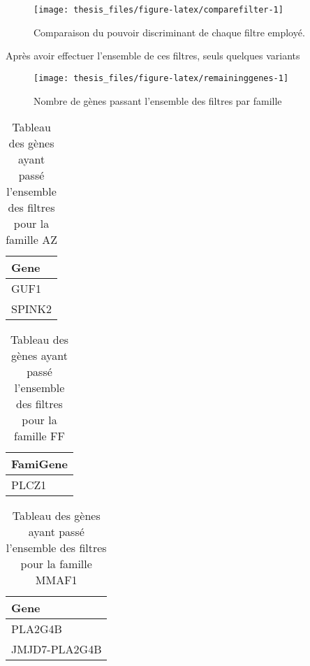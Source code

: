\documentclass[12pt,twoside]{reedthesis}
\theoremstyle{definition}
\theoremstyle{definition}
\theoremstyle{remark}
\begin{document}
  \begin{figure}
  
  {\centering \texttt{[image: thesis\_files/figure-latex/comparefilter-1]} 
  
  }
  
  \caption[Comparaison du pouvoir discriminant de chaque filtre employé.]{Comparaison du pouvoir discriminant de chaque filtre employé.}\label{fig:comparefilter}
  \end{figure}
  
  Après avoir effectuer l'ensemble de ces filtres, seuls quelques variants
  
  \begin{figure}
  
  {\centering \texttt{[image: thesis\_files/figure-latex/remaininggenes-1]} 
  
  }
  
  \caption[Nombre de gènes passant l'ensemble des filtres par famille]{Nombre de gènes passant l'ensemble des filtres par famille}\label{fig:remaininggenes}
  \end{figure}
  
  \begin{table}
  
  \caption{\label{tab:tablegeneaz}Tableau des gènes ayant passé l'ensemble des filtres pour la famille AZ}
  \centering
  \begin{tabular}[t]{l}
  \hline
  Gene\\
  \hline
  GUF1\\
  \hline
  SPINK2\\
  \hline
  \end{tabular}
  \end{table}
  
  \begin{table}
  
  \caption{\label{tab:tablegeneff}Tableau des gènes ayant passé l'ensemble des filtres pour la famille FF}
  \centering
  \begin{tabular}[t]{l}
  \hline
  FamiGene\\
  \hline
  PLCZ1\\
  \hline
  \end{tabular}
  \end{table}
  
  \begin{table}
  
  \caption{\label{tab:tablegenemmaf1}Tableau des gènes ayant passé l'ensemble des filtres pour la famille MMAF1}
  \centering
  \begin{tabular}[t]{l}
  \hline
  Gene\\
  \hline
  PLA2G4B\\
  \hline
  JMJD7-PLA2G4B\\
  \hline
  \end{tabular}
  \end{table}
  
\end{document}
